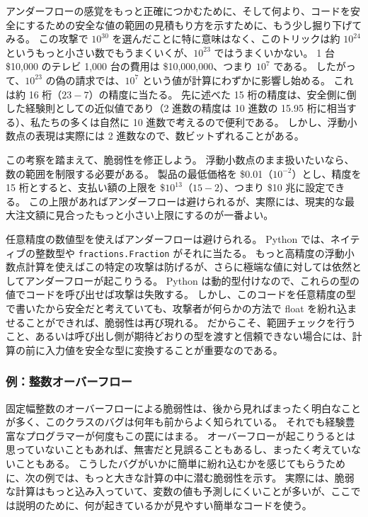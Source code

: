 \documentclass[uplatex]{jsarticle}
\def\label#1{}%
\begin{document}
アンダーフローの感覚をもっと正確につかむために、そして何より、コードを安全にするための安全な値の範囲の見積もり方を示すために、もう少し掘り下げてみる。
この攻撃で $10^{30}$ を選んだことに特に意味はなく、このトリックは約 $10^{24}$ というもっと小さい数でもうまくいくが、$10^{23}$ ではうまくいかない。
1 台 \$10,000 のテレビ 1,000 台の費用は \$10,000,000、つまり $10^7$ である。
したがって、$10^{23}$ の偽の請求では、$10^7$ という値が計算にわずかに影響し始める。
これは約 16 桁（$23-7$）の精度に当たる。
先に述べた 15 桁の精度は、安全側に倒した経験則としての近似値であり（2 進数の精度は 10 進数の 15.95 桁に相当する）、私たちの多くは自然に 10 進数で考えるので便利である。
しかし、浮動小数点の表現は実際には 2 進数なので、数ビットずれることがある。

この考察を踏まえて、脆弱性を修正しよう。
浮動小数点のまま扱いたいなら、数の範囲を制限する必要がある。
製品の最低価格を \$0.01（$10^{-2}$）とし、精度を 15 桁とすると、支払い額の上限を \$$10^{13}$（$15-2$）、つまり \$10 兆に設定できる。
この上限があればアンダーフローは避けられるが、実際には、現実的な最大注文額に見合ったもっと小さい上限にするのが一番よい。

任意精度の数値型を使えばアンダーフローは避けられる。
Python では、ネイティブの整数型や \texttt{fractions.Fraction} がそれに当たる。
もっと高精度の浮動小数点計算を使えばこの特定の攻撃は防げるが、さらに極端な値に対しては依然としてアンダーフローが起こりうる。
Python は動的型付けなので、これらの型の値でコードを呼び出せば攻撃は失敗する。
しかし、このコードを任意精度の型で書いたから安全だと考えていても、攻撃者が何らかの方法で float を紛れ込ませることができれば、脆弱性は再び現れる。
だからこそ、範囲チェックを行うこと、あるいは呼び出し側が期待どおりの型を渡すと信頼できない場合には、計算の前に入力値を安全な型に変換することが重要なのである。

\subsubsection{例：整数オーバーフロー}\label{subsec:ch9-example-integer-overflow}

固定幅整数のオーバーフローによる脆弱性は、後から見ればまったく明白なことが多く、このクラスのバグは何年も前からよく知られている。
それでも経験豊富なプログラマーが何度もこの罠にはまる。
オーバーフローが起こりうるとは思っていないこともあれば、無害だと見誤ることもあるし、まったく考えていないこともある。
こうしたバグがいかに簡単に紛れ込むかを感じてもらうために、次の例では、もっと大きな計算の中に潜む脆弱性を示す。
実際には、脆弱な計算はもっと込み入っていて、変数の値も予測しにくいことが多いが、ここでは説明のために、何が起きているかが見やすい簡単なコードを使う。
\end{document}
